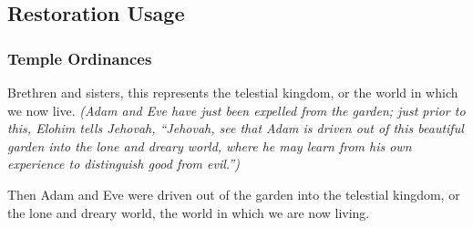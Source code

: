 	

\subsection{Restoration Usage} %
	\label{TELESTIAL-RESTORATION}

	
		
	\subsubsection{Temple Ordinances}
		\label{TELESTIAL-TEMPLE}
	
		\begin{compactdesc}
			\item[{\hyperref[TEMPLE-ENDOWMENT-ENDOW-PRE-1990-TELESTIAL]{Telestial kingdom}}] Brethren and sisters, this represents the telestial kingdom, or the world in which we now live. \textit{(Adam and Eve have just been expelled from the garden; just prior to this, Elohim tells Jehovah, ``Jehovah, see that Adam is driven out of this beautiful garden into the lone and dreary world, where he may learn from his own experience to distinguish good from evil.'')}
			\item[{\hyperref[TEMPLE-ENDOWMENT-ENDOW-PRE-1990-LECTURE]{Newer lecture at the veil}}] Then Adam and Eve were driven out of the garden into the telestial kingdom, or the lone and dreary world, the world in which we are now living. 
		\end{compactdesc}
	
